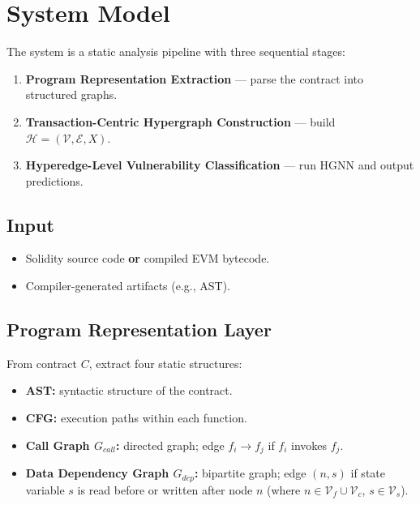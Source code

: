 \documentclass[11pt]{article}
\begin{document}
\section{System Model}

The system is a static analysis pipeline with three sequential stages:

\begin{enumerate}
    \item \textbf{Program Representation Extraction} --- parse the contract into structured graphs.
    \item \textbf{Transaction-Centric Hypergraph Construction} --- build $\mathcal{H} = (\mathcal{V}, \mathcal{E}, X)$.
    \item \textbf{Hyperedge-Level Vulnerability Classification} --- run HGNN and output predictions.
\end{enumerate}

\subsection{Input}

\begin{itemize}
    \item Solidity source code \textbf{or} compiled EVM bytecode.
    \item Compiler-generated artifacts (e.g., AST).
\end{itemize}

\subsection{Program Representation Layer}

From contract $C$, extract four static structures:

\begin{itemize}
    \item \textbf{AST:} syntactic structure of the contract.
    \item \textbf{CFG:} execution paths within each function.
    \item \textbf{Call Graph $G_{call}$:} directed graph; edge $f_i \to f_j$ if $f_i$ invokes $f_j$.
    \item \textbf{Data Dependency Graph $G_{dep}$:} bipartite graph; edge $(n, s)$ if state variable $s$ is read before or written after node $n$ (where $n \in \mathcal{V}_f \cup \mathcal{V}_c$, $s \in \mathcal{V}_s$).
\end{itemize}
\end{document}
